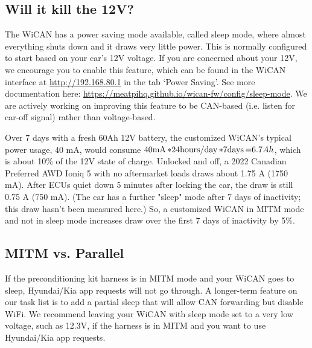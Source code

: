 \documentclass[superscriptaddress,onecolumn,floatfix]{revtex4-2}
\begin{document}
\subsection{Will it kill the 12V?}

The WiCAN has a power saving mode available, called sleep mode, where almost everything shuts down and it draws very little power. This is normally configured to start based on your car's 12V voltage. If you are concerned about your 12V, we encourage you to enable this feature, which can be found in the WiCAN interface at \href{http://192.168.80.1}{http://192.168.80.1} in the tab `Power Saving'. See more documentation here: \href{https://meatpihq.github.io/wican-fw/config/sleep-mode}{https://meatpihq.github.io/wican-fw/config/sleep-mode}. We are actively working on improving this feature to be CAN-based (i.e. listen for car-off signal) rather than voltage-based. 

Over 7 days with a fresh 60Ah 12V battery, the customized WiCAN's typical power usage, 40 mA, would consume $40 \unit[\mathrm{mA}] * 24 \unit[\mathrm{hours/day}] * 7 \unit[\mathrm{days}] = 6.7 Ah$, which is about 10\% of the 12V state of charge. Unlocked and off, a 2022 Canadian Preferred AWD Ioniq 5 with no aftermarket loads draws about 1.75 A (1750 mA). After ECUs quiet down 5 minutes after locking the car, the draw is still 0.75 A (750 mA). (The car has a further "sleep" mode after 7 days of inactivity; this draw hasn't been measured here.) So, a customized WiCAN in MITM mode and not in sleep mode increases draw over the first 7 days of inactivity by 5\%.

\subsection{MITM vs. Parallel}
If the preconditioning kit harness is in MITM mode and your WiCAN goes to sleep, Hyundai/Kia app requests will not go through. A longer-term feature on our task list is to add a partial sleep that will allow CAN forwarding but disable WiFi. We recommend leaving your WiCAN with sleep mode set to a very low voltage, such as 12.3V, if the harness is in MITM and you want to use Hyundai/Kia app requests. 
\end{document}
